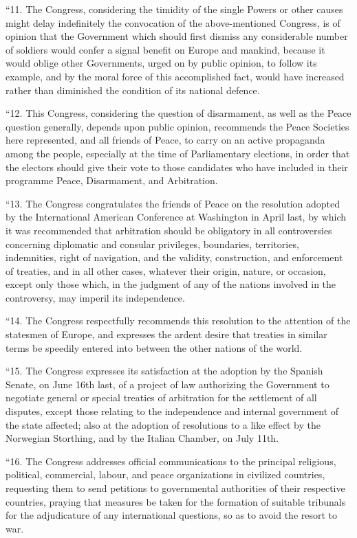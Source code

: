 \documentclass{book}
\begin{document}
“11. The Congress, considering the timidity of the single Powers or other causes might delay indefinitely the convocation of the above-mentioned Congress, is of opinion that the Government which should first dismiss any considerable number of soldiers would confer a signal benefit on Europe and mankind, because it would oblige other Governments, urged on by public opinion, to follow its example, and by the moral force of this accomplished fact, would have increased rather than diminished the condition of its national defence.

“12. This Congress, considering the question of disarmament, as well as the Peace question generally, depends upon public opinion, recommends the Peace Societies here represented, and all friends of Peace, to carry on an active propaganda among the people, especially at the time of Parliamentary elections, in order that the electors should give their vote to those candidates who have included in their programme Peace, Disarmament, and Arbitration.

“13. The Congress congratulates the friends of Peace on the resolution adopted by the International American Conference at Washington in April last, by which it was recommended that arbitration should be obligatory in all controversies concerning diplomatic and consular privileges, boundaries, territories, indemnities, right of navigation, and the validity, construction, and enforcement of treaties, and in all other cases, whatever their origin, nature, or occasion, except only those which, in the judgment of any of the nations involved in the controversy, may imperil its independence.

“14. The Congress respectfully recommends this resolution to the attention of the statesmen of Europe, and expresses the ardent desire that treaties in similar terms be speedily entered into between the other nations of the world.

“15. The Congress expresses its satisfaction at the adoption by the Spanish Senate, on June 16th last, of a project of law authorizing the Government to negotiate general or special treaties of arbitration for the settlement of all disputes, except those relating to the independence and internal government of the state affected; also at the adoption of resolutions to a like effect by the Norwegian Storthing, and by the Italian Chamber, on July 11th.

“16. The Congress addresses official communications to the principal religious, political, commercial, labour, and peace organizations in civilized countries, requesting them to send petitions to governmental authorities of their respective countries, praying that measures be taken for the formation of suitable tribunals for the adjudicature of any international questions, so as to avoid the resort to war.
\end{document}
